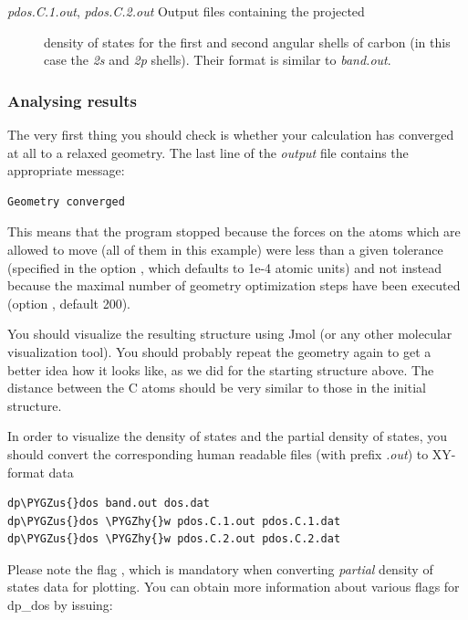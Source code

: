 \documentclass[a4paper,11pt,english]{sphinxmanual}
\def\PYGZus{\char`\_}
\def\PYGZhy{\char`\-}
\begin{document}
{{\begin{description}
\item[{\emph{pdos.C.1.out}, \emph{pdos.C.2.out} Output files containing the projected}] \leavevmode
density of states for the first and second angular shells of carbon
(in this case the \emph{2s} and \emph{2p} shells). Their format is similar to
\emph{band.out}.

\end{description}


\subsubsection{Analysing results}
\label{electstruct:analysing-results}
The very first thing you should check is whether your calculation has
converged at all to a relaxed geometry. The last line of the \emph{output}
file contains the appropriate message:

\begin{Verbatim}[commandchars=\\\{\}]
Geometry converged
\end{Verbatim}

This means that the program stopped because the forces on the atoms
which are allowed to move (all of them in this example) were less than
a given tolerance (specified in the option ,
which defaults to 1e-4 atomic units) and not instead because the
maximal number of geometry optimization steps have been executed
(option , default 200).

You should visualize the resulting structure using Jmol (or any other
molecular visualization tool). You should probably repeat the geometry
again to get a better idea how it looks like, as we did for the
starting structure above. The distance between the C atoms should be
very similar to those in the initial structure.

In order to visualize the density of states and the partial density of
states, you should convert the corresponding human readable files
(with prefix \emph{.out}) to XY-format data

\begin{Verbatim}[commandchars=\\\{\}]
dp\PYGZus{}dos band.out dos.dat
dp\PYGZus{}dos \PYGZhy{}w pdos.C.1.out pdos.C.1.dat
dp\PYGZus{}dos \PYGZhy{}w pdos.C.2.out pdos.C.2.dat
\end{Verbatim}

Please note the flag , which is mandatory when converting
\emph{partial} density of states data for plotting. You can obtain more
information about various flags for dp\_dos by issuing:

}}
\end{document}
